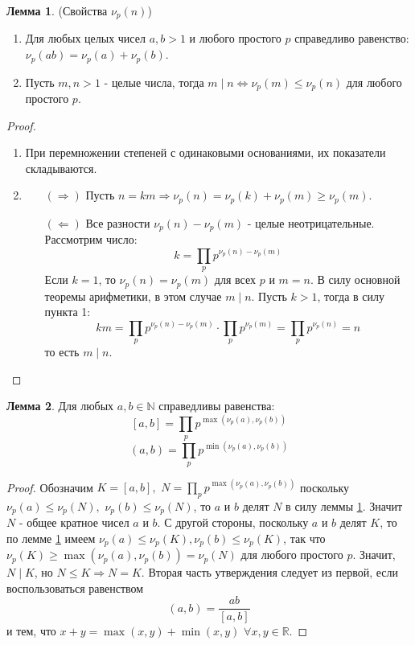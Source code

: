 \documentclass[a4paper, 12pt]{article}
\newcommand{\R}{\mathbb{R}}
\newcommand{\N}{\mathbb{N}}
\newcommand{\lra}{\Leftrightarrow}
\renewcommand{\div}{\mid}
\newcommand\tab[1][.5cm]{\hspace*{#1}}
\theoremstyle{definition}
\newtheorem{lemma}{Лемма}[section]
\begin{document}
    \begin{lemma} (Свойства $\nu_p(n)$) \label{lemma5.3}
        \begin{enumerate}
            \item Для любых целых чисел $a,b>1$ и любого простого $p$ справедливо равенство: $\nu_p(ab)=\nu_p(a)+\nu_p(b)$.
            \item Пусть $m,n>1$ - целые числа, тогда $m \div n \lra \nu_p(m)\leq \nu_p(n)$ для любого простого $p$.
        \end{enumerate}
    \end{lemma}
    \begin{proof} \tab
        \begin{enumerate}
            \item При перемножении степеней с одинаковыми основаниями, их показатели складываются.
            \item    
            \begin{itemize}
                \item[$(\Rightarrow)$] Пусть $n=km \Rightarrow \nu_p(n)=\nu_p(k)+\nu_p(m)\geq \nu_p(m)$.
                \item[$(\Leftarrow)$] Все разности $\nu_p(n)-\nu_p(m)$ - целые неотрицательные. Рассмотрим число:
                $$k = \prod\limits_pp^{\nu_p(n)-\nu_p(m)}$$ 
                Если $k=1$, то $\nu_p(n)=\nu_p(m)$ для всех $p$ и $m=n$. В силу основной теоремы арифметики, в этом случае $m \div n$. Пусть $k>1$, тогда в силу пункта 1:
                $$km=\prod\limits_pp^{\nu_p(n)-\nu_p(m)}\cdot \prod\limits_pp^{\nu_p(m)}=\prod\limits_pp^{\nu_p(n)}=n$$
                то есть $m \div n$. 
            \end{itemize}
        \end{enumerate}
    \end{proof}
    \begin{lemma}
        Для любых $a,b\in \N$ справедливы равенства:
        $$[a,b]=\prod\limits_pp^{\max(\nu_p(a),\nu_p(b))}$$
        $$(a,b)=\prod\limits_pp^{\min(\nu_p(a),\nu_p(b))}$$
    \end{lemma}
    \begin{proof}
        Обозначим $K=[a,b],$ $N=\prod\limits_pp^{\max(\nu_p(a),\nu_p(b))}$ поскольку\\ $\nu_p(a)\leq \nu_p(N),$ $\nu_p(b)\leq \nu_p(N)$, то $a$ и $b$ делят $N$ в силу леммы \ref{lemma5.3}. Значит $N$ - общее кратное чисел $a$ и $b$. С другой стороны, поскольку $a$ и $b$ делят $K$, то по лемме \ref{lemma5.3} имеем $\nu_p(a)\leq \nu_p(K),\nu_p(b)\leq \nu_p(K)$, так что $\nu_p(K)\geq \max(\nu_p(a), \nu_p(b))=\nu_p(N)$ для любого простого $p$. Значит, $N\div K$, но $N\leq K \Rightarrow N=K$. Вторая часть утверждения следует из первой, если воспользоваться равенством
        $$(a,b)=\frac{ab}{[a,b]}$$
        и тем, что $x+y=\max(x,y)+\min(x,y)$ $\forall x,y\in \R$.
    \end{proof}
\end{document}
